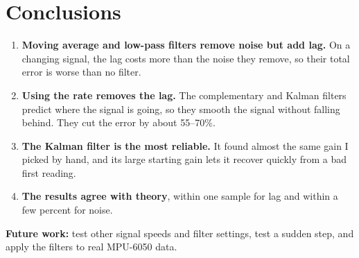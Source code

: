 \documentclass[11pt,a4paper]{article}
\begin{document}
\section{Conclusions}
\begin{enumerate}
  \item \textbf{Moving average and low-pass filters remove noise but add lag.} On a changing signal, the lag
        costs more than the noise they remove, so their total error is worse than no filter.
  \item \textbf{Using the rate removes the lag.} The complementary and Kalman filters predict where the signal is
        going, so they smooth the signal without falling behind. They cut the error by about 55--70\%.
  \item \textbf{The Kalman filter is the most reliable.} It found almost the same gain I picked by hand, and its
        large starting gain lets it recover quickly from a bad first reading.
  \item \textbf{The results agree with theory}, within one sample for lag and within a few percent for noise.
\end{enumerate}

\textbf{Future work:} test other signal speeds and filter settings, test a sudden step, and apply the filters to
real MPU-6050 data.
\end{document}
